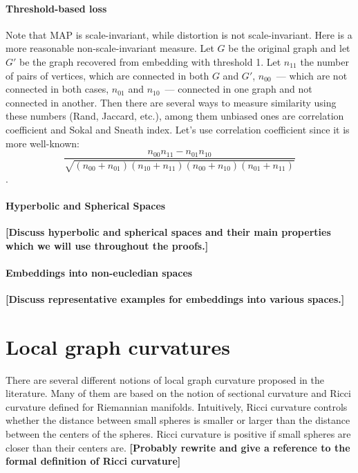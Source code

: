 \documentclass{article} %
\begin{document}
\paragraph{Threshold-based loss}

Note that MAP is scale-invariant, while distortion is not scale-invariant. Here is a more reasonable non-scale-invariant measure. Let $G$ be the original graph and let $G'$ be the graph recovered from embedding with threshold 1.
Let $n_{11}$ the number of pairs of vertices, which are connected in both $G$ and $G'$, $n_{00}$~--- which are not connected in both cases, $n_{01}$ and $n_{10}$~--- connected in one graph and not connected in another. Then there are several ways to measure similarity using these numbers (Rand, Jaccard, etc.), among them unbiased ones are correlation coefficient and Sokal and Sneath index. Let's use correlation coefficient since it is more well-known: \[\frac{n_{00}n_{11} - n_{01}n_{10}}{\sqrt{(n_{00} + n_{01})(n_{10} + n_{11})(n_{00} + n_{10})(n_{01} + n_{11})}}\].

\fi

\paragraph{Hyperbolic and Spherical Spaces} \textbf{[Discuss hyperbolic and spherical spaces and their main properties which we will use throughout the proofs.]}

\paragraph{Embeddings into non-eucledian spaces} \textbf{[Discuss representative examples for embeddings into various spaces.]}

\section{Local graph curvatures}

There are several different notions of local graph curvature proposed in the literature. Many of them are based on the notion of sectional curvature and Ricci curvature defined for Riemannian manifolds. Intuitively, Ricci curvature controls whether the distance between small spheres is smaller or larger than the distance between the centers of the spheres. 
Ricci curvature is positive if
small spheres are closer than their centers are.
\textbf{[Probably rewrite and give a reference to the formal definition of Ricci curvature]}
\end{document}
